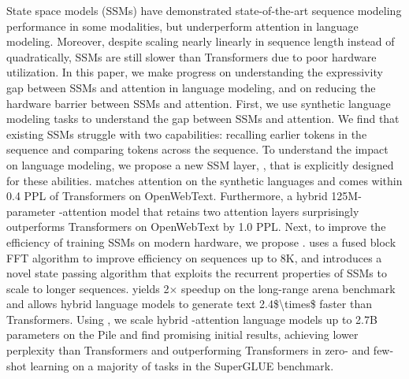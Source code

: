 
State space models (SSMs) have demonstrated state-of-the-art sequence modeling performance in some modalities, but underperform attention in language modeling.
Moreover, despite scaling nearly linearly in sequence length instead of quadratically, SSMs are still slower than Transformers due to poor hardware utilization.
In this paper, we make progress on understanding the expressivity gap between SSMs and attention in language modeling, and on reducing the hardware barrier between SSMs and attention.
First, we use synthetic language modeling tasks to understand the gap between SSMs and attention.
We find that existing SSMs struggle with two capabilities: recalling earlier tokens in the sequence and comparing tokens across the sequence.
To understand the impact on language modeling, we propose a new SSM layer, \hthree, that is explicitly designed for these abilities.
\hthree matches attention on the synthetic languages and comes within \num{0.4} PPL of Transformers on OpenWebText.
Furthermore, a hybrid 125M-parameter \hthree-attention model that retains two attention layers
surprisingly outperforms Transformers on OpenWebText by \num{1.0} PPL.
Next, to improve the efficiency of training SSMs on modern hardware,
we propose \fastfft.
\fastfft uses a fused block FFT algorithm to improve efficiency on sequences up to 8K, and introduces a novel state passing algorithm that exploits the recurrent properties of SSMs to scale to longer sequences.
\fastfft yields 2$\times$ speedup on the long-range arena benchmark and allows hybrid language models to generate text \num{2.4$\times$} faster than Transformers.
Using \fastfft, we scale hybrid \hthree-attention language models up to 2.7B parameters on the Pile and find promising initial results, achieving lower perplexity than Transformers and outperforming Transformers in zero- and few-shot learning on a majority of tasks in the SuperGLUE benchmark.

